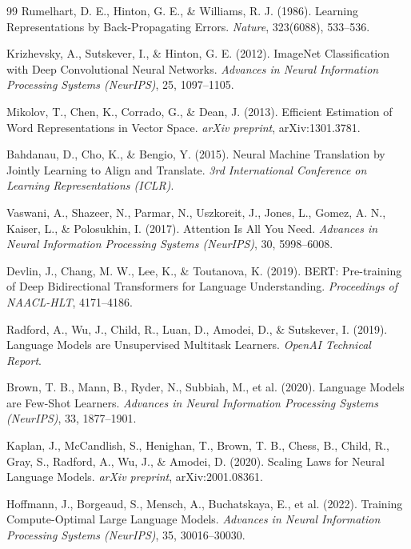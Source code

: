 \begin{thebibliography}{99}
Rumelhart, D. E., Hinton, G. E., \& Williams, R. J. (1986). Learning Representations by Back-Propagating Errors.
\textit{Nature}, 323(6088), 533--536.

Krizhevsky, A., Sutskever, I., \& Hinton, G. E. (2012). ImageNet Classification with Deep Convolutional Neural Networks.
\textit{Advances in Neural Information Processing Systems (NeurIPS)}, 25, 1097--1105.

Mikolov, T., Chen, K., Corrado, G., \& Dean, J. (2013). Efficient Estimation of Word Representations in Vector Space.
\textit{arXiv preprint}, arXiv:1301.3781.

Bahdanau, D., Cho, K., \& Bengio, Y. (2015). Neural Machine Translation by Jointly Learning to Align and Translate.
\textit{3rd International Conference on Learning Representations (ICLR)}.

Vaswani, A., Shazeer, N., Parmar, N., Uszkoreit, J., Jones, L., Gomez, A. N., Kaiser, L., \& Polosukhin, I. (2017). Attention Is All You Need.
\textit{Advances in Neural Information Processing Systems (NeurIPS)}, 30, 5998--6008.

Devlin, J., Chang, M. W., Lee, K., \& Toutanova, K. (2019). BERT: Pre-training of Deep Bidirectional Transformers for Language Understanding.
\textit{Proceedings of NAACL-HLT}, 4171--4186.

Radford, A., Wu, J., Child, R., Luan, D., Amodei, D., \& Sutskever, I. (2019). Language Models are Unsupervised Multitask Learners.
\textit{OpenAI Technical Report}.

Brown, T. B., Mann, B., Ryder, N., Subbiah, M., et al. (2020). Language Models are Few-Shot Learners.
\textit{Advances in Neural Information Processing Systems (NeurIPS)}, 33, 1877--1901.

Kaplan, J., McCandlish, S., Henighan, T., Brown, T. B., Chess, B., Child, R., Gray, S., Radford, A., Wu, J., \& Amodei, D. (2020). Scaling Laws for Neural Language Models.
\textit{arXiv preprint}, arXiv:2001.08361.

Hoffmann, J., Borgeaud, S., Mensch, A., Buchatskaya, E., et al. (2022). Training Compute-Optimal Large Language Models.
\textit{Advances in Neural Information Processing Systems (NeurIPS)}, 35, 30016--30030.


\end{thebibliography}
